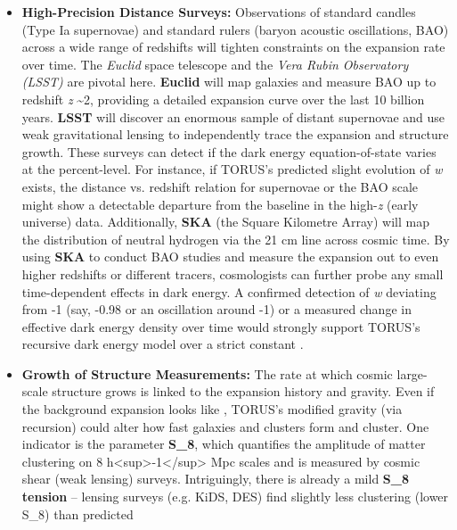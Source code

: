 \documentclass[
]{article}
\begin{document}
{\begin{itemize}
\item
  \textbf{High-Precision Distance Surveys:} Observations of standard
  candles (Type Ia supernovae) and standard rulers (baryon acoustic
  oscillations, BAO) across a wide range of redshifts will tighten
  constraints on the expansion rate over time. The \emph{Euclid} space
  telescope and the \emph{Vera Rubin Observatory (LSST)} are pivotal
  here. \textbf{Euclid} will map galaxies and measure BAO up to redshift
  \emph{z} \textasciitilde2, providing a detailed expansion curve over
  the last 10 billion years. \textbf{LSST} will discover an enormous
  sample of distant supernovae and use weak gravitational lensing to
  independently trace the expansion and structure growth. These surveys
  can detect if the dark energy equation-of-state varies at the
  percent-level. For instance, if TORUS's predicted slight evolution of
  \emph{w} exists, the distance vs. redshift relation for supernovae or
  the BAO scale might show a detectable departure from the \LambdaCDM baseline
  in the high-\emph{z} (early universe) data\hspace{0pt}. Additionally,
  \textbf{SKA} (the Square Kilometre Array) will map the distribution of
  neutral hydrogen via the 21 cm line across cosmic time. By using
  \textbf{SKA} to conduct BAO studies and measure the expansion out to
  even higher redshifts or different tracers, cosmologists can further
  probe any small time-dependent effects in dark energy\hspace{0pt}. A
  confirmed detection of \emph{w} deviating from -1 (say, -0.98 or an
  oscillation around -1) or a measured change in effective dark energy
  density over time would strongly support TORUS's recursive dark energy
  model over a strict constant \Lambda.
\item
  \textbf{Growth of Structure Measurements:} The rate at which cosmic
  large-scale structure grows is linked to the expansion history and
  gravity. Even if the background expansion looks like \LambdaCDM, TORUS's
  modified gravity (via recursion) could alter how fast galaxies and
  clusters form and cluster. One indicator is the parameter
  \textbf{S_{8}{}}, which
  quantifies the amplitude of matter clustering on 8
  h\textless sup\textgreater-1\textless/sup\textgreater{} Mpc scales and
  is measured by cosmic shear (weak lensing) surveys. Intriguingly,
  there is already a mild
  \textbf{S_{8}{}
  tension} -- lensing surveys (e.g. KiDS, DES) find slightly less
  clustering (lower
  S_{8}) than predicted

\end{itemize}}
\end{document}
